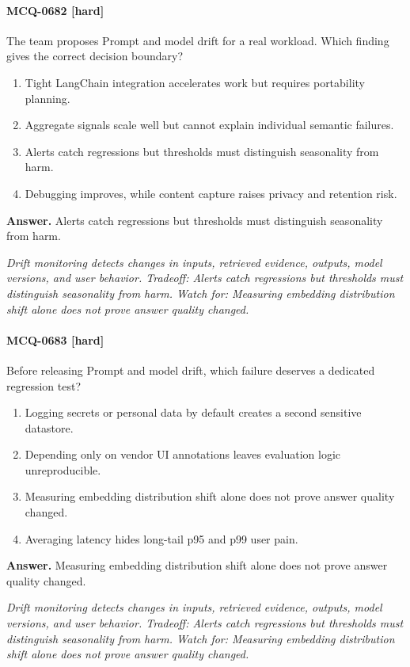 \paragraph{MCQ-0682 [hard]} The team proposes Prompt and model drift for a real workload. Which finding gives the correct decision boundary?
\begin{enumerate}[label=\Alph*.]
\item Tight LangChain integration accelerates work but requires portability planning.
\item Aggregate signals scale well but cannot explain individual semantic failures.
\item Alerts catch regressions but thresholds must distinguish seasonality from harm.
\item Debugging improves, while content capture raises privacy and retention risk.
\end{enumerate}
\noindent\textbf{Answer.} Alerts catch regressions but thresholds must distinguish seasonality from harm.
\par\textit{Drift monitoring detects changes in inputs, retrieved evidence, outputs, model versions, and user behavior. Tradeoff: Alerts catch regressions but thresholds must distinguish seasonality from harm. Watch for: Measuring embedding distribution shift alone does not prove answer quality changed.}
\paragraph{MCQ-0683 [hard]} Before releasing Prompt and model drift, which failure deserves a dedicated regression test?
\begin{enumerate}[label=\Alph*.]
\item Logging secrets or personal data by default creates a second sensitive datastore.
\item Depending only on vendor UI annotations leaves evaluation logic unreproducible.
\item Measuring embedding distribution shift alone does not prove answer quality changed.
\item Averaging latency hides long-tail p95 and p99 user pain.
\end{enumerate}
\noindent\textbf{Answer.} Measuring embedding distribution shift alone does not prove answer quality changed.
\par\textit{Drift monitoring detects changes in inputs, retrieved evidence, outputs, model versions, and user behavior. Tradeoff: Alerts catch regressions but thresholds must distinguish seasonality from harm. Watch for: Measuring embedding distribution shift alone does not prove answer quality changed.}
